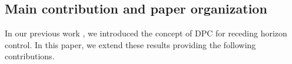 \subsection{Main contribution and paper organization}
In our previous work \cite{Behl2016,Jain2016,JainACC2017,JainCDC2017}, we introduced the concept of DPC for receding horizon control. In this paper, we extend these results providing the following contributions.

